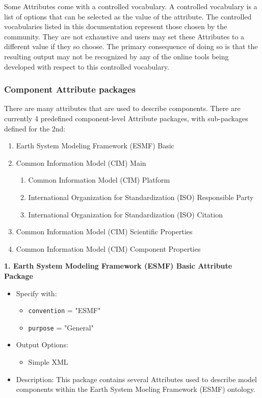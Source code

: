 Some Attributes come with a controlled vocabulary. A controlled vocabulary is a list of options that can be selected as the value of the attribute. The controlled vocabularies listed in this documentation represent those chosen by the community. They are not exhaustive and users may set these Attributes to a different value if they so choose. The primary consequence of doing so is that the resulting output may not be recognized by any of the online tools being developed with respect to this controlled vocabulary.


\subsubsection{Component Attribute packages}
\label{ComponentAttributePackages}

There are many attributes that are used to describe components. There are currently 4 predefined component-level Attribute packages, with sub-packages defined for the 2nd:

\begin{enumerate}
    \item Earth System Modeling Framework (ESMF) Basic
    \item Common Information Model (CIM) Main
    \begin{enumerate}
        \item Common Information Model (CIM) Platform
        \item International Organization for Standardization (ISO) Responsible Party
        \item International Organization for Standardization (ISO) Citation
    \end{enumerate}
    \item Common Information Model (CIM) Scientific Properties
    \item Common Information Model (CIM) Component Properties
\end{enumerate}

\vspace{.20in}

{\bf 1. Earth System Modeling Framework (ESMF) Basic Attribute Package}

\begin{itemize}
    \item Specify with:
    \begin{itemize}
        \item {\tt convention} = "ESMF"
        \item {\tt purpose} = "General"
    \end{itemize}
    \item Output Options:
    \begin{itemize}
        \item Simple XML
    \end{itemize}
    \item Description: This package contains several Attributes used to describe model components within the Earth System Moeling Framework (ESMF) ontology.
\end{itemize}



